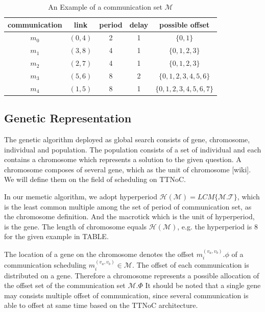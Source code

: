 \documentclass[conference]{IEEEtran}
\begin{document}
\begin{table}[!t]
	\renewcommand{\arraystretch}{1.3}
	\caption{An Example of a communication set $\mathcal{M}$}
	\label{t:comm_info}
	\centering
	\begin{tabular}{|c||c||c||c||c|}
		\hline
		communication & link & period & delay & possible offset\\
		\hline
		$m_{0}$ & $ (0,4) $ & 2 & 1 & $\{0,1\}$\\
		\hline
		$m_{1}$ & $ (3,8) $ & 4 & 1 & $\{0,1,2,3\}$\\
		\hline
		$m_{2}$ & $ (2,7) $ & 4 & 1 & $\{0,1,2,3\}$\\
		\hline		
		$m_{3}$ & $ (5,6) $ & 8 & 2 & $\{0,1,2,3,4,5,6\}$\\
		\hline
		$m_{4}$ & $ (1,5) $ & 8 & 1 & $\{0,1,2,3,4,5,6,7\}$\\
		\hline		
	\end{tabular}
\end{table}

\subsection{Genetic Representation}

The genetic algorithm deployed as global search consists of gene, chromosome, individual and population. The population consists of a set of individual and each contains a chromosome which represents a solution to the given question. A chromosome composes of several gene, which as the unit of chromosome [wiki]. We will define them on the field of scheduling on TTNoC.

In our memetic algorithm, we adopt hyperperiod  $\mathcal{H(M)} = LCM\{\mathcal{M.T}\}$, which is the least common multiple among the set of period of communication set, as the chromosome definition. And the macrotick which is the unit of hyperperiod, is the gene. The length of chromosome equals $\mathcal{H(M)}$, e.g. the hyperperiod is 8 for the given example in TABLE. 

The location of a gene on the chromosome denotes the offset $ m_{i}^{(v_{a},v_{b})}.\phi $ of a communication scheduling $ {m_{i}^{(v_{a},v_{b})}\in\mathcal{M}} $. The offset of each communication is distributed on a gene. Therefore a chromosome represents a possible allocation of the offset set of the communication set $\mathcal{M}.\Phi$ It should be noted that a single gene may consists multiple offset of communication, since several communication is able to offset at same time based on the TTNoC architecture.
\end{document}
